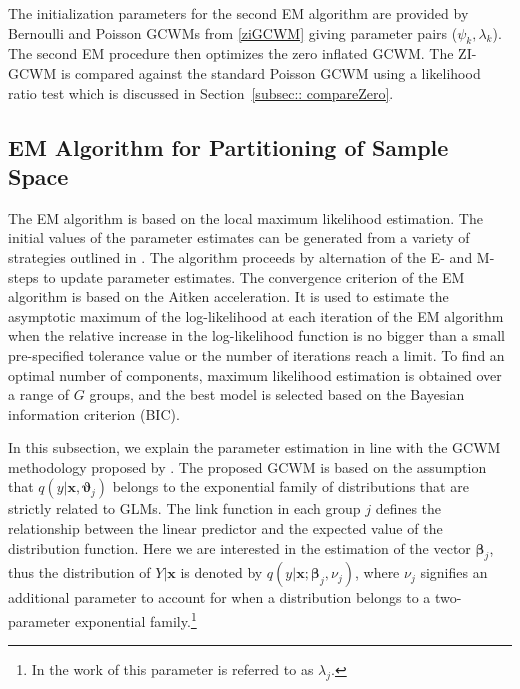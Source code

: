 \documentclass[12pt,letterpaper]{article}
\numberwithin{equation}{section}
\numberwithin{equation}{section}
\numberwithin{equation}{section}
\newcommand{\xTilda}{\tilde{\bm{x}}}
\begin{document}
The initialization parameters for the second EM algorithm are provided by Bernoulli and Poisson GCWMs from \eqref{ziGCWM} giving parameter pairs ($ \psi_k,\lambda_k  $). The second EM procedure then optimizes the zero inflated GCWM. The ZI-GCWM is compared against the standard Poisson GCWM using a likelihood ratio test which is discussed in Section~\ref{subsec:: compareZero}.



\subsection{EM Algorithm for Partitioning of Sample Space}

The EM algorithm is based on the local  maximum likelihood estimation. %
The initial values of the parameter estimates can be generated from a variety of strategies outlined in \cite{initialPaperGrassiaRef}. %
 The algorithm proceeds by alternation of the E- and M-steps to update parameter estimates. %
%
The convergence criterion of the EM algorithm is based on the Aitken acceleration. It is used to estimate the asymptotic maximum of the log-likelihood at each iteration of the EM algorithm when the relative increase in the log-likelihood function is no bigger than a small pre-specified tolerance value or the number of iterations reach a limit. %
To find an optimal number of components, maximum likelihood estimation is obtained over a range of $G$ groups, and the best model is selected based on the Bayesian information criterion (BIC).   %

In this subsection, we explain the parameter estimation in line with the GCWM methodology proposed by \cite{Ingrassia+Punzo+Vittadini+Minotti:2015}. The proposed GCWM  is based on the assumption that $q(y|\bm{x},\bm{\vartheta}_j)$ belongs to the exponential family of distributions that are strictly related to GLMs. The link function in each group $j$ defines the relationship between the linear predictor and the expected value of the distribution function.   %
Here we are interested in the estimation of the vector $\bm {\beta}_j$, thus the distribution of $Y|\bm{x}$ is denoted by $q(y|\bm{x}; \bm{\beta}_j, \nu_j)$, where $\nu_j$ signifies an additional parameter to account for when a distribution belongs to a two-parameter exponential family.\footnote{In the work of \cite{Ingrassia+Punzo+Vittadini+Minotti:2015} this parameter is referred to as $\lambda_j$.} 
\end{document}
